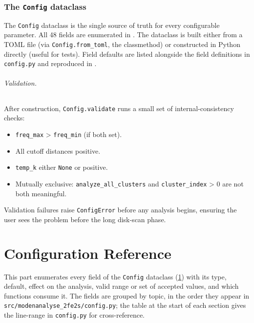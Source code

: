 \documentclass[10pt,a4paper,twoside]{article}
\newcommand{\codref}[1]{%
  \quad\text{\textcolor{gray!70!black}{\footnotesize $\rightsquigarrow$~\texttt{#1}}}}
\newcommand{\fn}[1]{\texttt{#1}}
\newcommand{\file}[1]{\texttt{#1}}
\newcommand{\cfgkey}[1]{\texttt{#1}}
\begin{document}
\section{The \fn{Config} dataclass}
\label{sec:dataclass-config}

\codref{config.Config}

The \fn{Config} dataclass is the single source of truth for every
configurable parameter. All 48 fields are enumerated in
\cref{part:config}. The dataclass is built either from a TOML file
(via \fn{Config.from\_toml}, the classmethod) or constructed in
Python directly (useful for tests). Field defaults are listed
alongside the field definitions in \file{config.py} and reproduced
in \cref{part:config}.

\paragraph{Validation.}
After construction, \fn{Config.validate} runs a small set of
internal-consistency checks:
\begin{itemize}
  \item \cfgkey{freq\_max} > \cfgkey{freq\_min} (if both set).
  \item All cutoff distances positive.
  \item \cfgkey{temp\_k} either \texttt{None} or positive.
  \item Mutually exclusive: \cfgkey{analyze\_all\_clusters} and
        \cfgkey{cluster\_index} > 0 are not both meaningful.
\end{itemize}
Validation failures raise \fn{ConfigError} before any analysis
begins, ensuring the user sees the problem before the long
disk-scan phase.

\part{Configuration Reference}
\label{part:config}

This part enumerates every \cfgkey{} field of the \fn{Config}
dataclass (\cref{sec:dataclass-config}) with its type, default,
effect on the analysis, valid range or set of accepted values, and
which functions consume it. The fields are grouped by topic, in the
order they appear in \file{src/modenanalyse\_2fe2s/config.py}; the
table at the start of each section gives the line-range in
\file{config.py} for cross-reference.
\end{document}
